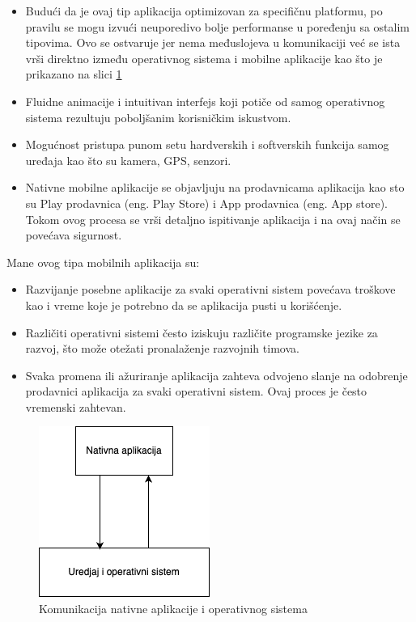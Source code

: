 \documentclass[12pt,oneside]{memoir}
\begin{document}
\begin{itemize}
    \item Budući da je ovaj tip aplikacija optimizovan za specifičnu platformu, po pravilu se mogu izvući neuporedivo bolje performanse u poređenju sa ostalim tipovima. Ovo se ostvaruje jer nema međuslojeva u komunikaciji već se ista vrši direktno između operativnog sistema i mobilne aplikacije kao što je prikazano na slici \ref{fig:nativeMobileApp}
    \item Fluidne animacije i intuitivan interfejs koji potiče od samog operativnog sistema rezultuju poboljšanim korisničkim iskustvom.
    \item Mogućnost pristupa punom setu hardverskih i softverskih funkcija samog uređaja kao što su kamera, GPS, senzori.
    \item Nativne mobilne aplikacije se objavljuju na prodavnicama aplikacija kao sto su Play prodavnica (eng. Play Store) i App prodavnica (eng. App store). Tokom ovog procesa se vrši detaljno ispitivanje aplikacija i na ovaj način se povećava sigurnost.
\end{itemize}
Mane ovog tipa mobilnih aplikacija su:
\begin{itemize}
    \item Razvijanje posebne aplikacije za svaki operativni sistem povećava troškove kao i vreme koje je potrebno da se aplikacija pusti u korišćenje.
    \item Različiti operativni sistemi često iziskuju različite programske jezike za razvoj, što može otežati pronalaženje razvojnih timova.
    \item Svaka promena ili ažuriranje aplikacija zahteva odvojeno slanje na odobrenje prodavnici aplikacija za svaki operativni sistem. Ovaj proces je često vremenski zahtevan.
\end{itemize}

\begin{figure}[h]
    \centering
    \includegraphics[scale=0.5]{docs/images/chapterTwo/nativnaAplikacija.png}
    \caption{Komunikacija nativne aplikacije i operativnog sistema}
    \label{fig:nativeMobileApp}
\end{figure}
\end{document}
